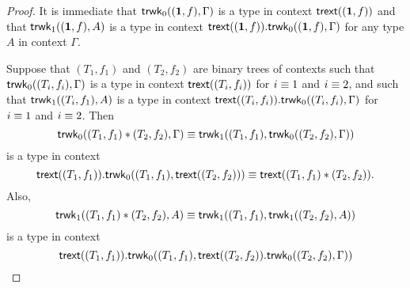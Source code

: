 \begin{proof}
It is immediate that $\mathsf{trwk}_0((\mathbf{1},f),\Gamma)$ is a type in context $\mathsf{trext}((\mathbf{1},f))$
and that $\mathsf{trwk}_1((\mathbf{1},f),A)$ is a type in context $\ctxext{\trext((\unit,f))}
{\trwk_0((\unit,f),\Gamma)}$ for any type $A$ in context $\Gamma$.

Suppose that $(T_1,f_1)$ and $(T_2,f_2)$ are binary trees of contexts such that
$\mathsf{trwk}_0((T_i,f_i),\Gamma)$ is a type in context
$\mathsf{trext}((T_i,f_i))$ for $i\equiv 1$ and $i\equiv 2$, and such that
$\mathsf{trwk}_1((T_i,f_1),A)$ is a type in context $\ctxext{\trext((T_i,f_i))}{\trwk_0((T_i,f_i),\Gamma)}$
for $i\equiv 1$ and $i\equiv 2$. Then
\begin{equation*}
\mathsf{trwk}_0((T_1,f_1)*(T_2,f_2),\Gamma) 
\equiv \mathsf{trwk}_1((T_1,f_1),\mathsf{trwk}_0((T_2,f_2),\Gamma))
\end{equation*}
is a type in context
\begin{equation*}
\ctxext{\trext((T_1,f_1))}{\trwk_0((T_1,f_1),\trext((T_2,f_2)))}
\jdeq \trext((T_1,f_1)*(T_2,f_2)).
\end{equation*}
Also,
\begin{equation*}
\mathsf{trwk}_1((T_1,f_1)*(T_2,f_2),A) \equiv \mathsf{trwk}_1((T_1,f_1),\mathsf{trwk}_1((T_2,f_2),A))
\end{equation*}
is a type in context
\begin{equation*}
\ctxext{\trext((T_1,f_1))}{\trwk_0((T_1,f_1),\ctxext{\trext((T_2,f_2))}{\trwk_0((T_2,f_2),\Gamma))}}
\end{equation*}
\end{proof}

